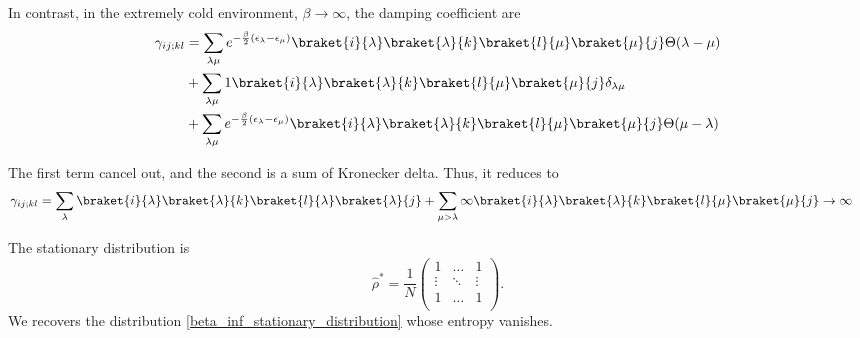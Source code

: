 In contrast, in the extremely cold environment, $\beta \rightarrow \infty$, the damping coefficient are
\begin{equation}
    \begin{split}
        \gamma_{ij;kl}&= \sum_{\lambda\mu}e^{-\frac{\beta}{2}\left(\epsilon_\lambda - \epsilon_\mu\right)}\braket{i}{\lambda}\braket{\lambda}{k}\braket{l}{\mu}\braket{\mu}{j}\Theta(\lambda-\mu)\\
        & + \sum_{\lambda\mu} 1\braket{i}{\lambda}\braket{\lambda}{k}\braket{l}{\mu}\braket{\mu}{j}\delta_{\lambda\mu}\\
        & + \sum_{\lambda\mu} e^{-\frac{\beta}{2}\left(\epsilon_\lambda - \epsilon_\mu\right)}\braket{i}{\lambda}\braket{\lambda}{k}\braket{l}{\mu}\braket{\mu}{j}\Theta(\mu-\lambda)
    \end{split}
\end{equation}

The first term cancel out,  and the second is a sum of Kronecker delta. Thus, it reduces to
\begin{equation}\label{gamma_T=0}
    \begin{split}
        \gamma_{ij;kl}&= \sum_{\lambda}\braket{i}{\lambda}\braket{\lambda}{k}\braket{l}{\lambda}\braket{\lambda}{j}+ \sum_{\mu>\lambda}\infty\braket{i}{\lambda}\braket{\lambda}{k}\braket{l}{\mu}\braket{\mu}{j} \rightarrow \infty
    \end{split}
\end{equation}

The stationary distribution is 
\begin{equation}
    \hat\rho^* = \frac{1}{N}\begin{pmatrix}
        1&\dots&1\\
        \vdots&\ddots&\vdots\\
        1&\dots&1\\
    \end{pmatrix}.
\end{equation}
We recovers the distribution \eqref{beta_inf_stationary_distribution} whose entropy vanishes. 

